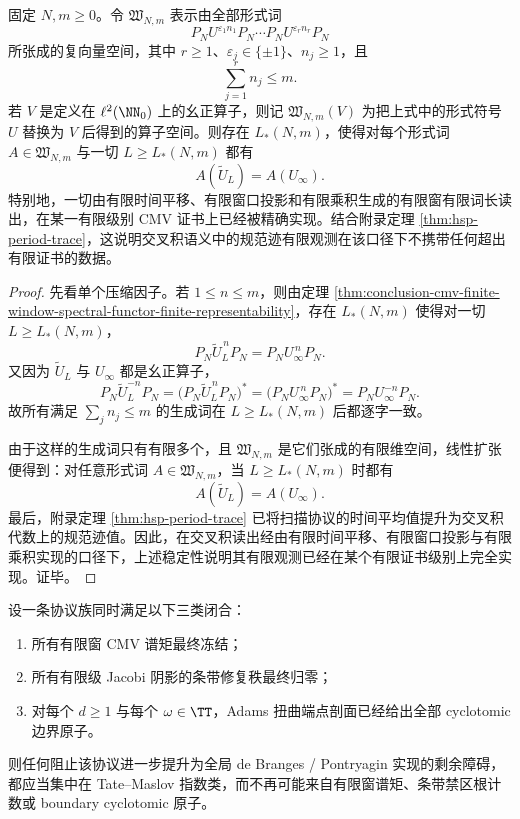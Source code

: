 \begin{theorem}[交叉积规范迹的有限窗有限词长完全有限化]\label{thm:conclusion-crossed-product-canonical-trace-finite-window-finite-word-realization}
固定 \(N,m\ge0\)。令 \(\mathfrak W_{N,m}\) 表示由全部形式词
\[
P_NU^{\varepsilon_1 n_1}P_N\cdots P_NU^{\varepsilon_r n_r}P_N
\]
所张成的复向量空间，其中 \(r\ge1\)、\(\varepsilon_j\in\{\pm1\}\)、\(n_j\ge1\)，且
\[
\sum_{j=1}^r n_j\le m.
\]
若 \(V\) 是定义在 \(\ell^2(\NN_0)\) 上的幺正算子，则记 \(\mathfrak W_{N,m}(V)\) 为把上式中的形式符号 \(U\) 替换为 \(V\) 后得到的算子空间。则存在 \(L_\ast(N,m)\)，使得对每个形式词 \(A\in \mathfrak W_{N,m}\) 与一切 \(L\ge L_\ast(N,m)\) 都有
\[
A(\widetilde U_L)=A(U_\infty).
\]
特别地，一切由有限时间平移、有限窗口投影和有限乘积生成的有限窗有限词长读出，在某一有限级别 CMV 证书上已经被精确实现。结合附录定理 \ref{thm:hsp-period-trace}，这说明交叉积语义中的规范迹有限观测在该口径下不携带任何超出有限证书的数据。
\end{theorem}
\begin{proof}
先看单个压缩因子。若 \(1\le n\le m\)，则由定理 \ref{thm:conclusion-cmv-finite-window-spectral-functor-finite-representability}，存在 \(L_\ast(N,m)\) 使得对一切 \(L\ge L_\ast(N,m)\)，
\[
P_N\widetilde U_L^{\,n}P_N=P_NU_\infty^{\,n}P_N.
\]
又因为 \(\widetilde U_L\) 与 \(U_\infty\) 都是幺正算子，
\[
P_N\widetilde U_L^{-n}P_N
=
\bigl(P_N\widetilde U_L^{\,n}P_N\bigr)^\ast
=
\bigl(P_NU_\infty^{\,n}P_N\bigr)^\ast
=
P_NU_\infty^{-n}P_N.
\]
故所有满足 \(\sum_j n_j\le m\) 的生成词在 \(L\ge L_\ast(N,m)\) 后都逐字一致。

由于这样的生成词只有有限多个，且 \(\mathfrak W_{N,m}\) 是它们张成的有限维空间，线性扩张便得到：对任意形式词 \(A\in\mathfrak W_{N,m}\)，当 \(L\ge L_\ast(N,m)\) 时都有
\[
A(\widetilde U_L)=A(U_\infty).
\]
最后，附录定理 \ref{thm:hsp-period-trace} 已将扫描协议的时间平均值提升为交叉积代数上的规范迹值。因此，在交叉积读出经由有限时间平移、有限窗口投影与有限乘积实现的口径下，上述稳定性说明其有限观测已经在某个有限证书级别上完全实现。证毕。
\end{proof}

\begin{conjecture}\label{conj:conclusion-tate-maslov-only-remaining-global-obstruction}
设一条协议族同时满足以下三类闭合：
\begin{enumerate}
  \item 所有有限窗 CMV 谱矩最终冻结；
  \item 所有有限级 Jacobi 阴影的条带修复秩最终归零；
  \item 对每个 \(d\ge1\) 与每个 \(\omega\in\TT\)，Adams 扭曲端点剖面已经给出全部 cyclotomic 边界原子。
\end{enumerate}
则任何阻止该协议进一步提升为全局 de Branges / Pontryagin 实现的剩余障碍，都应当集中在 Tate--Maslov 指数类，而不再可能来自有限窗谱矩、条带禁区根计数或 boundary cyclotomic 原子。
\end{conjecture}

